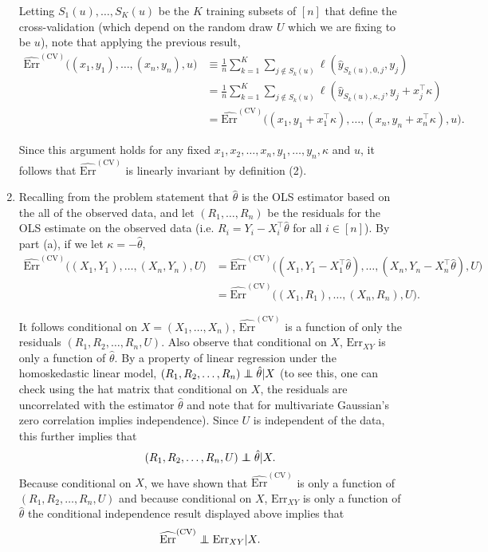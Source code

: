 \begin{enumerate}[label=(\alph*)]
Letting $S_1(u),\dots,S_K(u)$ be the $K$ training subsets of $[n]$ that define the cross-validation (which depend on the random draw $U$ which we are fixing to be $u$), note that applying the previous result, $$\begin{aligned}
\widehat{\text{Err}}^{(\text{CV})} \Big( (x_1,y_1), \dots, (x_n,y_n),u \Big) & \equiv \frac{1}{n} \sum_{k=1}^K \sum_{j \notin S_k(u)  } \ell(\hat{y}_{S_k(u),0,j},y_j)
\\ & =  \frac{1}{n} \sum_{k=1}^K \sum_{j \notin S_k(u)  } \ell(\hat{y}_{S_k(u),\kappa,j},y_j+x_j^\top   \kappa)
\\ & = \widehat{\text{Err}}^{(\text{CV})} \Big( (x_1,y_1+x_1^\top   \kappa), \dots, (x_n,y_n +x_n^\top   \kappa),u \Big).
 \end{aligned}$$
 
 Since this argument holds for any fixed $x_1,x_2, \dots,x_n, y_1,\dots,y_n, \kappa$ and $u$, it follows that $\widehat{\text{Err}}^{(\text{CV})}$ is linearly invariant by definition (2).

\item Recalling from the problem statement that $\hat{\theta}$ is the OLS estimator based on the all of the observed data, and let $(R_1,\dots,R_n)$ be the residuals for the OLS estimate on the observed data (i.e. $R_i=Y_i -X_i^\top   \hat{\theta}$ for all $i \in [n]$). By part (a), if we let $\kappa = - \hat{\theta}$, 
$$\begin{aligned} \widehat{\text{Err}}^{(\text{CV})} \Big( (X_1,Y_1), \dots, (X_n,Y_n),U \Big) & = \widehat{\text{Err}}^{(\text{CV})} \Big( (X_1,Y_1 -X_1^\top   \hat{\theta}), \dots, (X_n, Y_n-X_n^\top   \hat{\theta}),U \Big) 
\\ & = \widehat{\text{Err}}^{(\text{CV})} \Big( (X_1,R_1), \dots, (X_n,R_n),U \Big) .\end{aligned}$$

It follows conditional on $X=(X_1,\dots,X_n)$, $\widehat{\text{Err}}^{(\text{CV})} $ is a function of only the residuals $(R_1,R_2, \dots,R_n,U)$. Also observe that conditional on $X$, $\text{Err}_{XY}$ is only a function of $\hat{\theta}$. By a property of linear regression under the homoskedastic linear model, $(R_1,R_2,\dots,R_n) \independent \hat{\theta} | X$ (to see this, one can check using the hat matrix that conditional on $X$, the residuals are uncorrelated with the estimator $\hat{\theta}$ and note that for multivariate Gaussian's zero correlation implies independence). Since $U$ is independent of the data, this further implies that  $$(R_1,R_2,\dots,R_n,U) \independent \hat{\theta} | X.$$ Because conditional on $X$, we have shown that $\widehat{\text{Err}}^{(\text{CV})} $ is only a function of $(R_1,R_2, \dots,R_n,U)$ and because conditional on $X$, $\text{Err}_{XY}$ is only a function of $\hat{\theta}$ the conditional independence result displayed above implies that $$\widehat{\text{Err}}^{(\text{CV})} \independent \text{Err}_{XY} | X.$$


\end{enumerate}
